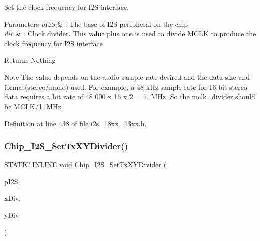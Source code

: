 Set the clock frequency for I2S interface. 


\begin{DoxyParams}{Parameters}
{\em p\+I2S} & \+: The base of I2S peripheral on the chip \\
\hline
{\em div} & \+: Clock divider. This value plus one is used to divide M\+C\+LK to produce the clock frequency for I2S interface \\
\hline
\end{DoxyParams}
\begin{DoxyReturn}{Returns}
Nothing 
\end{DoxyReturn}
\begin{DoxyNote}{Note}
The value depends on the audio sample rate desired and the data size and format(stereo/mono) used. For example, a 48 k\+Hz sample rate for 16-\/bit stereo data requires a bit rate of 48 000 x 16 x 2 = 1. M\+Hz. So the mclk\+\_\+divider should be M\+C\+L\+K/1. M\+Hz 
\end{DoxyNote}


Definition at line 438 of file i2s\+\_\+18xx\+\_\+43xx.\+h.

\mbox{\label{group___i2_s__18_x_x__43_x_x_gaab4e4a66774d56ba378cce2dbc34e9b0}} 
\subsubsection{\texorpdfstring{Chip\+\_\+\+I2\+S\+\_\+\+Set\+Tx\+X\+Y\+Divider()}{Chip\_I2S\_SetTxXYDivider()}}
{\footnotesize\ttfamily \hyperlink{group___l_p_c___types___public___macros_ga10b2d890d871e1489bb02b7e70d9bdfb}{S\+T\+A\+T\+IC} \hyperlink{spifi__18xx__43xx_8h_a2eb6f9e0395b47b8d5e3eeae4fe0c116}{I\+N\+L\+I\+NE} void Chip\+\_\+\+I2\+S\+\_\+\+Set\+Tx\+X\+Y\+Divider (\begin{DoxyParamCaption}\item[{\hyperlink{struct_l_p_c___i2_s___t}{L\+P\+C\+\_\+\+I2\+S\+\_\+T} $\ast$}]{p\+I2S,  }\item[{uint8\+\_\+t}]{x\+Div,  }\item[{uint8\+\_\+t}]{y\+Div }\end{DoxyParamCaption})}



